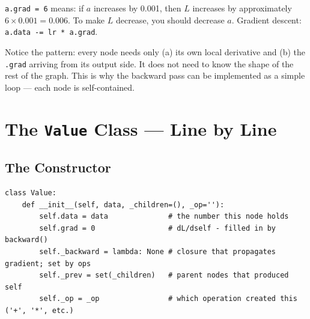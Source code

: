 \documentclass[12pt,a4paper]{article}
\newcommand{\code}[1]{\texttt{\small\color{deepblue}#1}}
\begin{document}
\begin{notebox}
\code{a.grad = 6} means: if $a$ increases by 0.001, then $L$ increases by approximately $6 \times 0.001 = 0.006$. To make $L$ decrease, you should decrease $a$. Gradient descent: \code{a.data -= lr * a.grad}.
\end{notebox}

\begin{thinkbox}
Notice the pattern: every node needs only (a) its own local derivative and (b) the \code{.grad} arriving from its output side. It does not need to know the shape of the rest of the graph. This is why the backward pass can be implemented as a simple loop — each node is self-contained.
\end{thinkbox}

\section{The \texttt{Value} Class — Line by Line}

\subsection{The Constructor}

\begin{lstlisting}
class Value:
    def __init__(self, data, _children=(), _op=''):
        self.data = data              # the number this node holds
        self.grad = 0                 # dL/dself - filled in by backward()
        self._backward = lambda: None # closure that propagates gradient; set by ops
        self._prev = set(_children)   # parent nodes that produced self
        self._op = _op                # which operation created this ('+', '*', etc.)
\end{lstlisting}
\end{document}
